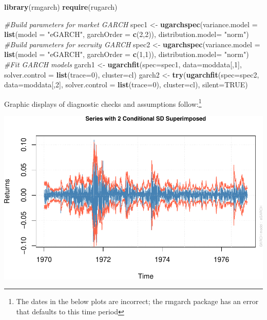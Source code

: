 \documentclass[]{elsarticle} %
\makeatletter
\newenvironment{Shaded}{\begin{snugshade}}{\end{snugshade}}
\newcommand{\KeywordTok}[1]{\textcolor[rgb]{0.13,0.29,0.53}{\textbf{{#1}}}}
\newcommand{\DataTypeTok}[1]{\textcolor[rgb]{0.13,0.29,0.53}{{#1}}}
\newcommand{\DecValTok}[1]{\textcolor[rgb]{0.00,0.00,0.81}{{#1}}}
\newcommand{\StringTok}[1]{\textcolor[rgb]{0.31,0.60,0.02}{{#1}}}
\newcommand{\CommentTok}[1]{\textcolor[rgb]{0.56,0.35,0.01}{\textit{{#1}}}}
\newcommand{\OtherTok}[1]{\textcolor[rgb]{0.56,0.35,0.01}{{#1}}}
\newcommand{\NormalTok}[1]{{#1}}
\def\maxwidth{\ifdim\Gin@nat@width>\linewidth\linewidth
\else\Gin@nat@width\fi}
\let\Oldincludegraphics\includegraphics
\renewcommand{\includegraphics}[1]{\Oldincludegraphics[width=\maxwidth]{#1}}
\makeatother
\begin{document}
\begin{Shaded}
\begin{Highlighting}[]
\KeywordTok{library}\NormalTok{(rmgarch)}
\KeywordTok{require}\NormalTok{(rugarch)}

\CommentTok{#Build parameters for market GARCH}
        \NormalTok{spec1 <-}\StringTok{ }\KeywordTok{ugarchspec}\NormalTok{(}\DataTypeTok{variance.model =} \KeywordTok{list}\NormalTok{(}\DataTypeTok{model =} \StringTok{"eGARCH"}\NormalTok{, }\DataTypeTok{garchOrder =} \KeywordTok{c}\NormalTok{(}\DecValTok{2}\NormalTok{,}\DecValTok{2}\NormalTok{)),}
                                \DataTypeTok{distribution.model=} \StringTok{"norm"}\NormalTok{)}
\CommentTok{#Build parameters for secruity GARCH}
        \NormalTok{spec2 <-}\StringTok{ }\KeywordTok{ugarchspec}\NormalTok{(}\DataTypeTok{variance.model =} \KeywordTok{list}\NormalTok{(}\DataTypeTok{model =} \StringTok{"eGARCH"}\NormalTok{, }\DataTypeTok{garchOrder =} \KeywordTok{c}\NormalTok{(}\DecValTok{1}\NormalTok{,}\DecValTok{1}\NormalTok{)),}
                                \DataTypeTok{distribution.model=} \StringTok{"norm"}\NormalTok{)}
\CommentTok{#Fit GARCH models}
        \NormalTok{garch1 <-}\StringTok{ }\KeywordTok{ugarchfit}\NormalTok{(}\DataTypeTok{spec=}\NormalTok{spec1, }\DataTypeTok{data=}\NormalTok{moddata[,}\DecValTok{1}\NormalTok{], }\DataTypeTok{solver.control =} \KeywordTok{list}\NormalTok{(}\DataTypeTok{trace=}\DecValTok{0}\NormalTok{), }
                            \DataTypeTok{cluster=}\NormalTok{cl)}
        \NormalTok{garch2 <-}\StringTok{ }\KeywordTok{try}\NormalTok{(}\KeywordTok{ugarchfit}\NormalTok{(}\DataTypeTok{spec=}\NormalTok{spec2, }\DataTypeTok{data=}\NormalTok{moddata[,}\DecValTok{2}\NormalTok{], }\DataTypeTok{solver.control =} \KeywordTok{list}\NormalTok{(}\DataTypeTok{trace=}\DecValTok{0}\NormalTok{), }
                            \DataTypeTok{cluster=}\NormalTok{cl), }\DataTypeTok{silent=}\OtherTok{TRUE}\NormalTok{)}
\end{Highlighting}
\end{Shaded}

Graphic displays of diagnostic checks and assumptions follow:\footnote{The
  dates in the below plots are incorrect; the rmgarch package has an
  error that defaults to this time period}

\includegraphics{report_files/figure-latex/analysis201-1.pdf}
\end{document}
